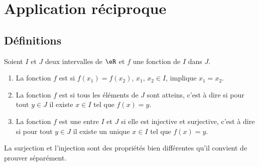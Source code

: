 \section{Application réciproque}

\subsection{Définitions}

\begin{definition}
    Soient \( I\) et \( J\) deux intervalles de \( \eR\) et $f$ une fonction de $I$ dans $J$.
    \begin{enumerate}
        \item
            La fonction \( f\) est  si \( f(x_1)=f(x_2)\), $x_1,\, x_2\in I$,  implique \( x_1=x_2\).

        \item

            La fonction \( f\) est  si tous les éléments de \( J\) sont atteins, c'est à dire si pour tout \( y\in J\) il existe \( x\in I\) tel que \( f(x)=y\).

        \item
            La fonction \( f\) est une  entre \( I\) et \( J\) si elle est injective et surjective, c'est à dire si pour tout \( y\in J\) il existe un unique \( x\in I\) tel que \( f(x)=y\).
    \end{enumerate}
\end{definition}
La surjection et l'injection sont des propriétés bien différentes qu'il convient de prouver séparément.

